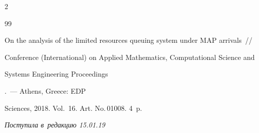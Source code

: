 \begin{multicols}{2}
{{\begin{thebibliography}{99}


On the analysis of the limited resources queuing system under MAP arrivals~// 


{Conference (International) on Applied Mathematics, Computational Science and 


Systems Engineering Proceedings}.~--- Athens, Greece: EDP 


Sciences, 2018. Vol.~16. Art. No.\,01008. 4~p.


 \end{thebibliography}





 }


 }





\end{multicols}





\vspace*{-9pt}





\hfill{\small\textit{Поступила в~редакцию 15.01.19}}










\pagebreak










\vspace*{-28pt}

























